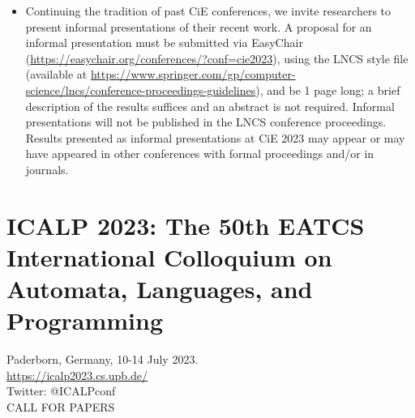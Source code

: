 \documentclass[prodmode,acmtecs]{acmsmall} %
\begin{document}
\begin{itemize}
\begin{itemize}\item  Continuing the tradition of past CiE conferences, we invite researchers to present informal presentations of their recent work. A proposal for an informal presentation must be submitted via EasyChair (\href{https://easychair.org/conferences/?conf=cie2023}{https://easychair.org/conferences/?conf=cie2023}), using the LNCS style file (available at \href{https://www.springer.com/gp/computer-science/lncs/conference-proceedings-guidelines}{https://www.springer.com/gp/computer-science/lncs/conference-proceedings-guidelines}), and be 1 page long; a brief description of the results suffices and an abstract is not required. Informal presentations will not be published in the LNCS conference proceedings. Results presented as informal presentations at CiE 2023 may appear or may have appeared in other conferences with formal proceedings and/or in journals.
\end{itemize} 
\end{itemize}\section{ICALP 2023: The 50th EATCS International Colloquium on Automata, Languages, and Programming}\label{ICALP2023}  Paderborn, Germany, 10-14 July 2023.\\ 
  \href{https://icalp2023.cs.upb.de/}{https://icalp2023.cs.upb.de/}\\ 
  Twitter: @ICALPconf\\ 
CALL FOR PAPERS 
\end{document}
